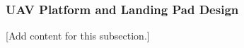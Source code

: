 
\subsubsection{UAV Platform and Landing Pad Design}
\label{subsubsec:design_3_7_uav_platform_landing_pad_design}

[Add content for this subsection.]
